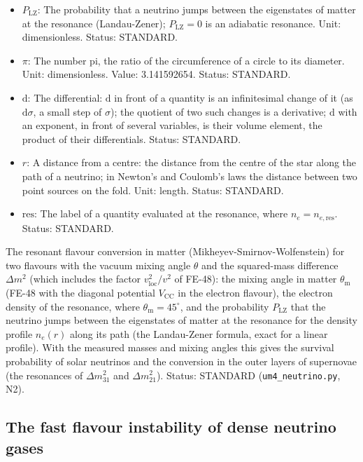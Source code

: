 \documentclass[
  10pt,
]{article}
\begin{document}
\begin{itemize}
  \(n_{e,\mathrm{res}}\): The electron density at which the flavour
  conversion in matter is resonant (the Mikheyev-Smirnov-Wolfenstein
  resonance). Unit: GeV\(^3\). Status: STANDARD.
\item
  \(P_{\mathrm{LZ}}\): The probability that a neutrino jumps between the
  eigenstates of matter at the resonance (Landau-Zener);
  \(P_{\mathrm{LZ}} = 0\) is an adiabatic resonance. Unit:
  dimensionless. Status: STANDARD.
\item
  \(\pi\): The number pi, the ratio of the circumference of a circle to
  its diameter. Unit: dimensionless. Value: 3.141592654. Status:
  STANDARD.
\item
  \(\mathrm{d}\): The differential: \(\mathrm{d}\) in front of a
  quantity is an infinitesimal change of it (as \(\mathrm{d}\sigma\), a
  small step of \(\sigma\)); the quotient of two such changes is a
  derivative; \(\mathrm{d}\) with an exponent, in front of several
  variables, is their volume element, the product of their
  differentials. Status: STANDARD.
\item
  \(r\): A distance from a centre: the distance from the centre of the
  star along the path of a neutrino; in Newton's and Coulomb's laws the
  distance between two point sources on the fold. Unit: length. Status:
  STANDARD.
\item
  \(\mathrm{res}\): The label of a quantity evaluated at the resonance,
  where \(n_e = n_{e,\mathrm{res}}\). Status: STANDARD.
\end{itemize}

The resonant flavour conversion in matter (Mikheyev-Smirnov-Wolfenstein)
for two flavours with the vacuum mixing angle \(\theta\) and the
squared-mass difference \(\Delta m^2\) (which includes the factor
\(v_{\mathrm{loc}}^2/v^2\) of FE-48): the mixing angle in matter
\(\theta_{\mathrm{m}}\) (FE-48 with the diagonal potential
\(V_{\mathrm{CC}}\) in the electron flavour), the electron density of
the resonance, where \(\theta_{\mathrm{m}} = 45^\circ\), and the
probability \(P_{\mathrm{LZ}}\) that the neutrino jumps between the
eigenstates of matter at the resonance for the density profile
\(n_e(r)\) along its path (the Landau-Zener formula, exact for a linear
profile). With the measured masses and mixing angles this gives the
survival probability of solar neutrinos and the conversion in the outer
layers of supernovae (the resonances of \(\Delta m^2_{31}\) and
\(\Delta m^2_{21}\)). Status: STANDARD (\texttt{um4\_neutrino.py}, N2).

\hypertarget{the-fast-flavour-instability-of-dense-neutrino-gases}{%
\subsection{The fast flavour instability of dense neutrino
gases}\label{the-fast-flavour-instability-of-dense-neutrino-gases}}
\end{document}
